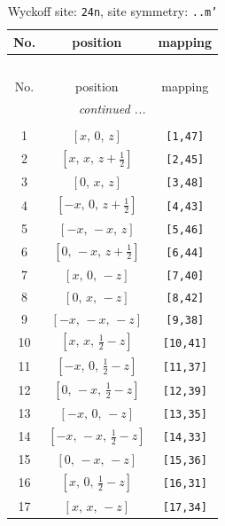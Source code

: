 \documentclass[fleqn,8pt]{jsarticle}
\begin{document}
\begin{longtable}{ccc}
\caption{Wyckoff site: {\tt 24n}, site symmetry: {\tt ..m'}}
 \\
 \hline \hline
No. & position & mapping \\ \hline \endfirsthead

\multicolumn{2}{l}{\tablename\ \thetable{}} \\
 \hline \hline
No. & position & mapping \\ \hline \endhead

 \hline \hline
\multicolumn{2}{r}{\footnotesize\it continued ...} \\ \endfoot

 \hline \hline
\multicolumn{2}{r}{} \\ \endlastfoot

1 & $\left[ x,\, 0,\, z \right]$ & {\tt [1,47]} \\ \hline
2 & $\left[ x,\, x,\, z + \frac{1}{2} \right]$ & {\tt [2,45]} \\ \hline
3 & $\left[ 0,\, x,\, z \right]$ & {\tt [3,48]} \\ \hline
4 & $\left[ - x,\, 0,\, z + \frac{1}{2} \right]$ & {\tt [4,43]} \\ \hline
5 & $\left[ - x,\, - x,\, z \right]$ & {\tt [5,46]} \\ \hline
6 & $\left[ 0,\, - x,\, z + \frac{1}{2} \right]$ & {\tt [6,44]} \\ \hline
7 & $\left[ x,\, 0,\, - z \right]$ & {\tt [7,40]} \\ \hline
8 & $\left[ 0,\, x,\, - z \right]$ & {\tt [8,42]} \\ \hline
9 & $\left[ - x,\, - x,\, - z \right]$ & {\tt [9,38]} \\ \hline
10 & $\left[ x,\, x,\, \frac{1}{2} - z \right]$ & {\tt [10,41]} \\ \hline
11 & $\left[ - x,\, 0,\, \frac{1}{2} - z \right]$ & {\tt [11,37]} \\ \hline
12 & $\left[ 0,\, - x,\, \frac{1}{2} - z \right]$ & {\tt [12,39]} \\ \hline
13 & $\left[ - x,\, 0,\, - z \right]$ & {\tt [13,35]} \\ \hline
14 & $\left[ - x,\, - x,\, \frac{1}{2} - z \right]$ & {\tt [14,33]} \\ \hline
15 & $\left[ 0,\, - x,\, - z \right]$ & {\tt [15,36]} \\ \hline
16 & $\left[ x,\, 0,\, \frac{1}{2} - z \right]$ & {\tt [16,31]} \\ \hline
17 & $\left[ x,\, x,\, - z \right]$ & {\tt [17,34]} \\ \hline

\end{longtable}
\end{document}
